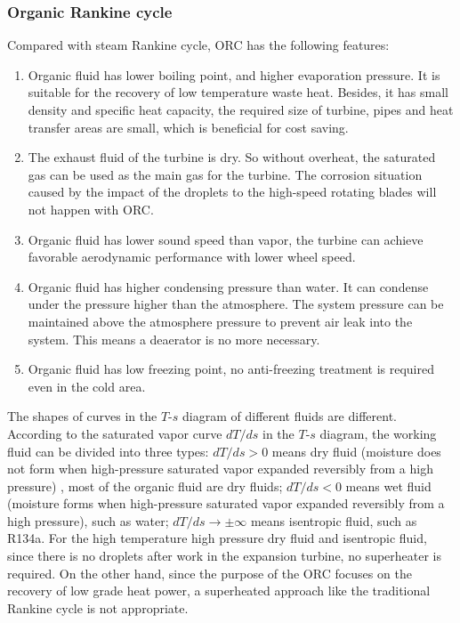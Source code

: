 \subsubsection{Organic Rankine cycle}
  
  Compared with steam Rankine cycle, ORC has the following features:
  \begin{enumerate}[label=(\arabic*)]
  \item Organic fluid has lower boiling point, and higher evaporation pressure. It is suitable for the recovery of low temperature waste heat. Besides, it has small density and specific heat capacity, the required size of turbine, pipes and heat transfer areas are small, which is beneficial for cost saving.
  \item The exhaust fluid of the turbine is dry. So without overheat, the saturated gas can be used as the main gas for the turbine. The corrosion situation caused by the impact of the droplets to the high-speed rotating blades will not happen with ORC.
  \item Organic fluid has lower sound speed than vapor, the turbine can achieve favorable aerodynamic performance with lower wheel speed. 
  \item Organic fluid has higher condensing pressure than water. It can condense under the pressure higher than the atmosphere. The system pressure can be maintained above the atmosphere pressure to prevent air leak into the system. This means a deaerator is no more necessary.
  \item Organic fluid has low freezing point, no anti-freezing treatment is required even in the cold area.
\end{enumerate}

The shapes of curves in the $T$-$s$ diagram of different fluids are different. According to the saturated vapor curve $dT/ds$ in the $T$-$s$ diagram, the working fluid can be divided into three types: $dT / ds > 0$ means dry fluid (moisture does not form when high-pressure saturated vapor expanded reversibly from a high pressure) , most of the organic fluid are dry fluids; $dT / ds < 0$ means wet fluid (moisture forms when high-pressure saturated vapor expanded reversibly from a high pressure), such as water; $dT/ds \rightarrow \pm\infty$ means isentropic fluid, such as R134a. For the high temperature high pressure dry fluid and isentropic fluid, since there is no droplets after work in the expansion turbine, no superheater is required. On the other hand, since the purpose of the ORC focuses on the recovery of low grade heat power, a superheated approach like the traditional Rankine cycle is not appropriate. 

